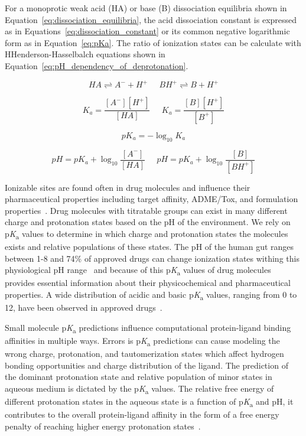 \documentclass[9pt,lineno,final]{elife}
\newcommand{\pKa}{p\textit{K}\textsubscript{a}}
\begin{document}
For a monoprotic weak acid (HA) or base (B) dissociation equilibria shown in Equation~\ref{eq:dissociation_equilibria}, the acid dissociation constant is expressed as in Equations~\ref{eq:dissociation_constant} or its common negative logarithmic form as in Equation~\ref{eq:pKa}. 
The ratio of ionization states can be calculate with HHenderson-Hasselbalch equations shown in Equation~\ref{eq:pH_dependency_of_deprotonation}. 

\begin{equation}
HA \rightleftharpoons A^- + H^+ \;\;\;\;\; BH^+ \rightleftharpoons B + H^+
\label{eq:dissociation_equilibria}
\end{equation}

\begin{equation}
K_a = \frac{[A^-][H^+]}{[HA]}\;\;\;\;\;K_a = \frac{[B][H^+]}{[B^+]} 
\label{eq:dissociation_constant}
\end{equation}


\begin{equation}
pK_a = -\log_{10}{K_a}
\label{eq:pKa}
\end{equation}


\begin{equation}
pH = pK_a + \log_{10}{\frac{[A^-]}{[HA]}}\;\;\;\;\;pH = pK_a + \log_{10}{\frac{[B]}{[BH^+]}}
\label{eq:pH_dependency_of_deprotonation}
\end{equation}


Ionizable sites are found often in drug molecules and influence their pharmaceutical properties including target affinity, ADME/Tox, and formulation properties~\citep{Manallack:2013:ChemSocRev}. 
Drug molecules with titratable groups can exist in many different charge and protonation states based on the pH of the environment. 
We rely on \pKa{} values to determine in which charge and protonation states the molecules exists and relative populations of these states. 
The pH of the human gut ranges between 1-8 and 74\% of approved drugs can change ionization states withing this physiological pH range~\citep{Manallack:2013:ChemMedChema} and because of this \pKa{} values of drug molecules provides essential information about their physicochemical and pharmaceutical properties. 
A wide distribution of acidic and basic \pKa{} values, ranging from 0 to 12, have been observed in approved drugs~\citep{Manallack:2013:ChemMedChema, Manallack:2013:ChemSocRev}.

Small molecule \pKa{} predictions influence computational protein-ligand binding affinities in multiple ways. 
Errors is \pKa{} predictions can cause modeling the wrong charge, protonation, and tautomerization states which affect hydrogen bonding opportunities and charge distribution of the ligand.
The prediction of the dominant protonation state and relative population of minor states in aqueous medium is dictated by the \pKa{} values. 
The relative free energy of different protonation states in the aqueous state is a function of \pKa{} and pH, it contributes to the overall protein-ligand affinity in the form of a free energy penalty of reaching higher energy protonation states~\citep{deOliveira:2019:J.Chem.TheoryComput.}.
\end{document}
